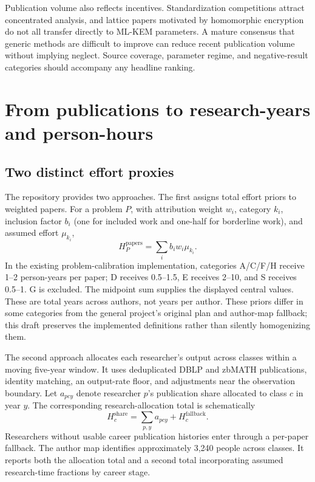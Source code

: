 \documentclass[11pt,letterpaper]{article}
\begin{document}
Publication volume also reflects incentives. Standardization competitions attract concentrated analysis, and lattice papers motivated by homomorphic encryption do not all transfer directly to ML-KEM parameters. A mature consensus that generic methods are difficult to improve can reduce recent publication volume without implying neglect. Source coverage, parameter regime, and negative-result categories should accompany any headline ranking.

\section{From publications to research-years and person-hours}
\subsection{Two distinct effort proxies}
The repository provides two approaches. The first assigns total effort priors to weighted papers. For a problem $P$, with attribution weight $w_i$, category $k_i$, inclusion factor $b_i$ (one for included work and one-half for borderline work), and assumed effort $\mu_{k_i}$,
\begin{equation}
 H^{\mathrm{papers}}_P=\sum_i b_i w_i\mu_{k_i}.
 \label{eq:papers}
\end{equation}
In the existing problem-calibration implementation, categories A/C/F/H receive 1--2 person-years per paper; D receives 0.5--1.5, E receives 2--10, and S receives 0.5--1. G is excluded. The midpoint sum supplies the displayed central values. These are total years across authors, not years per author. These priors differ in some categories from the general project's original plan and author-map fallback; this draft preserves the implemented definitions rather than silently homogenizing them.

The second approach allocates each researcher's output across classes within a moving five-year window. It uses deduplicated DBLP and zbMATH publications, identity matching, an output-rate floor, and adjustments near the observation boundary. Let $a_{pcy}$ denote researcher $p$'s publication share allocated to class $c$ in year $y$. The corresponding research-allocation total is schematically
\begin{equation}
 H^{\mathrm{share}}_c=\sum_{p,y}a_{pcy}+H^{\mathrm{fallback}}_c.
 \label{eq:share}
\end{equation}
Researchers without usable career publication histories enter through a per-paper fallback. The author map identifies approximately 3,240 people across classes. It reports both the allocation total and a second total incorporating assumed research-time fractions by career stage.\cite{study}
\end{document}
